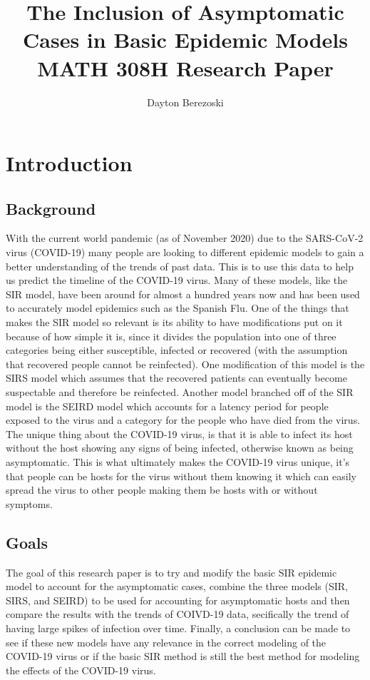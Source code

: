 \documentclass[12pt]{article} %
\title{The Inclusion of Asymptomatic Cases in Basic Epidemic Models\\
\small {MATH 308H Research Paper}}
\author{Dayton Berezoski}
\date{} %
\begin{document}
\maketitle

    \section{Introduction}
\subsection {Background}
With the current world pandemic (as of November 2020) due to the SARS-CoV-2 virus (COVID-19) many people are looking to different epidemic models to gain a better understanding of the trends of past data. This is to use this data to help us predict the timeline of the COVID-19 virus. Many of these models, like the SIR model, have been around for almost a hundred years now and has been used to accurately model epidemics such as the Spanish Flu. One of the things that makes the SIR model so relevant is its ability to have modifications put on it because of how simple it is, since it divides the population into one of three categories being either susceptible, infected or recovered (with the assumption that recovered people cannot be reinfected). One modification of this model is the SIRS model which assumes that the recovered patients can eventually become suspectable and therefore be reinfected. Another model branched off of the SIR model is the SEIRD model which accounts for a latency period for people exposed to the virus and a category for the people who have died from the virus.\\
\indent The unique thing about the COVID-19 virus, is that it is able to infect its host without the host showing any signs of being infected, otherwise known as being asymptomatic. This is what ultimately makes the COVID-19 virus unique, it’s that people can be hosts for the virus without them knowing it which can easily spread the virus to other people making them be hosts with or without symptoms.
\subsection{Goals}
\indent The goal of this research paper is to try and modify the basic SIR epidemic model to account for the asymptomatic cases, combine the three models (SIR, SIRS, and SEIRD) to be used for accounting for asymptomatic hosts and then compare the results with the trends of COIVD-19 data, secifically the trend of having large spikes of infection over time. Finally, a conclusion can be made to see if these new models have any relevance in the correct modeling of the COVID-19 virus or if the basic SIR method is still the best method for modeling the effects of the COVID-19 virus.
\end{document}
